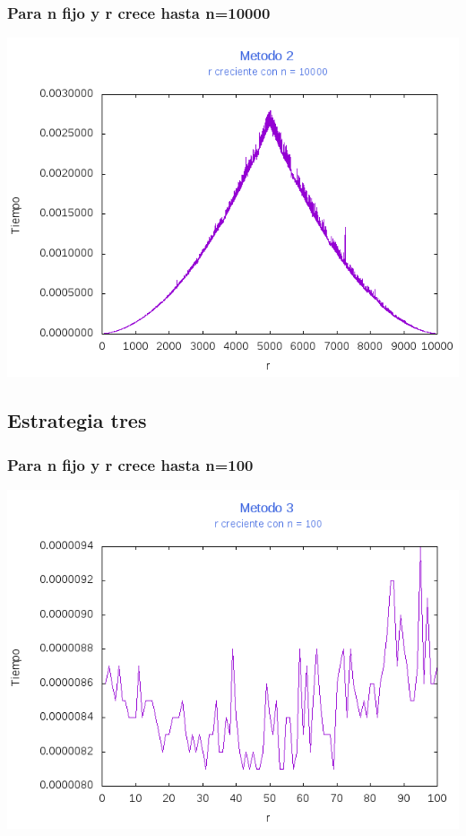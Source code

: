 \documentclass[12pt,letterpaper]{scrartcl}
\begin{document}
\subsubsection{Para n fijo y r crece hasta n=10000}
\includegraphics[scale=1]{Metodo2/plot10000m2}

\newpage

\subsection{Estrategia tres}

\subsubsection{Para n fijo y r crece hasta n=100}
\includegraphics[scale=1]{Metodo3/plot100m3}
\end{document}

